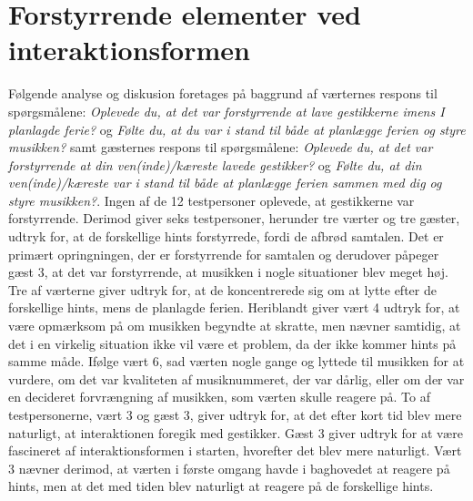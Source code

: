 \section{Forstyrrende elementer ved interaktionsformen}
\label{TestresultaterSocialAcceptForstyrrende}
%
Følgende analyse og diskusion foretages på baggrund af værternes respons til spørgsmålene: \textit{Oplevede du, at det var forstyrrende at lave gestikkerne imens I planlagde ferie?} og \textit{Følte du, at du var i stand til både at planlægge ferien og styre musikken?} samt gæsternes respons til spørgsmålene: \textit{Oplevede du, at det var forstyrrende at din ven(inde)/kæreste lavede gestikker?} og \textit{Følte du, at din ven(inde)/kæreste var i stand til både at planlægge ferien sammen med dig og styre musikken?}. \blankline
%
Ingen af de 12 testpersoner oplevede, at gestikkerne var forstyrrende. Derimod giver seks testpersoner, herunder tre værter og tre gæster, udtryk for, at de forskellige hints forstyrrede, fordi de afbrød samtalen. Det er primært opringningen, der er forstyrrende for samtalen og derudover påpeger gæst 3, at det var forstyrrende, at musikken i nogle situationer blev meget høj. Tre af værterne giver udtryk for, at de koncentrerede sig om at lytte efter de forskellige hints, mens de planlagde ferien. Heriblandt giver vært 4 udtryk for, at være opmærksom på om musikken begyndte at skratte, men nævner samtidig, at det i en virkelig situation ikke vil være et problem, da der ikke kommer hints på samme måde. Ifølge vært 6, sad værten nogle gange og lyttede til musikken for at vurdere, om det var kvaliteten af musiknummeret, der var dårlig, eller om der var en decideret forvrængning af musikken, som værten skulle reagere på. To af testpersonerne, vært 3 og gæst 3, giver udtryk for, at det efter kort tid blev mere naturligt, at interaktionen foregik med gestikker. Gæst 3 giver udtryk for at være fascineret af interaktionsformen i starten, hvorefter det blev mere naturligt. Vært 3 nævner derimod, at værten i første omgang havde i baghovedet at reagere på hints, men at det med tiden blev naturligt at reagere på de forskellige hints. 

